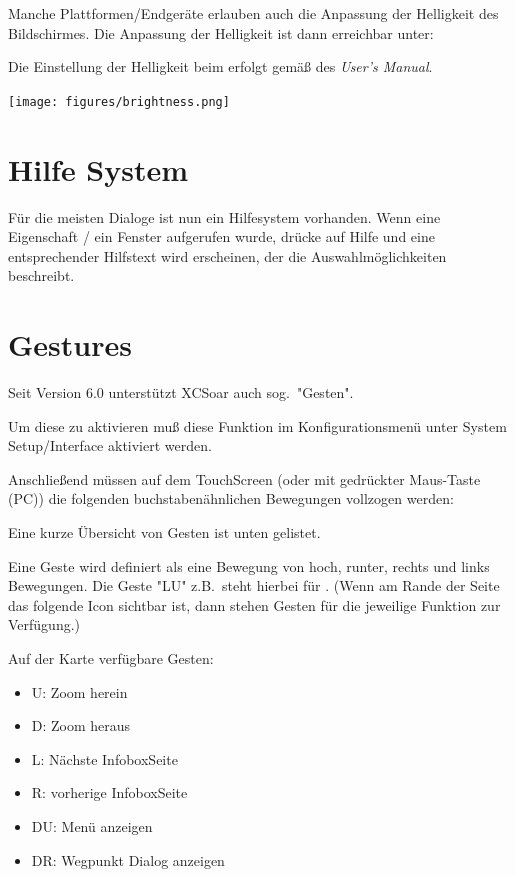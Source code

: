  Manche Plattformen/Endgeräte erlauben auch die Anpassung der Helligkeit des Bildschirmes. 
Die Anpassung der Helligkeit ist dann erreichbar unter:

\halt 
\begin{quote}
\blink{}\blink{}
\end{quote}

Die Einstellung der Helligkeit beim \al erfolgt gemäß des {\em \al User's Manual}.

\begin{center}
\texttt{[image: figures/brightness.png]}
\end{center}

\section{Hilfe System}
  Für die meisten Dialoge ist nun ein Hilfesystem vorhanden.
  Wenn eine Eigenschaft / ein Fenster aufgerufen wurde, drücke auf Hilfe und eine entsprechender Hilfstext wird erscheinen, der die Auswahlmöglichkeiten  beschreibt.

  \section{Gestures}\label{sec:gestures}
Seit Version 6.0 unterstützt \textsf{XCSoar} auch sog.\  "Gesten".

Um diese zu aktivieren muß diese Funktion im Konfigurationsmenü unter System Setup/Interface aktiviert werden. 

Anschließend müssen auf dem TouchScreen (oder mit gedrückter Maus-Taste (\textsf{PC})) die folgenden buchstabenähnlichen Bewegungen vollzogen werden:

Eine kurze Übersicht von Gesten ist unten gelistet.

Eine Geste wird definiert als eine Bewegung von hoch, runter, rechts und links Bewegungen.
Die Geste "LU"  z.B.\   steht hierbei für .
(Wenn am Rande der Seite das folgende Icon sichtbar ist, dann  stehen Gesten für die jeweilige Funktion zur Verfügung.)

Auf der Karte verfügbare Gesten:
\begin{itemize}
\item U: Zoom herein
\item D: Zoom heraus
\item L: Nächste InfoboxSeite
\item R: vorherige InfoboxSeite
\item DU: Menü anzeigen
\item DR: Wegpunkt Dialog anzeigen
\end{itemize}


